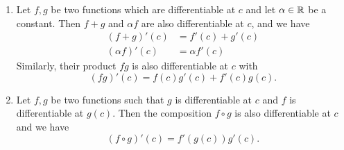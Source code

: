 \documentclass[10pt, a4paper]{article}
\begin{document}
\begin{theorem}\label{pre:analy:thm:sumscalarprodcomprulesfordiff}
    \begin{enumerate}[label = (\alph*)]
        \item 
        Let $f, g$ be two functions which are differentiable at $c$ and let $\alpha \in \mathbb{R}$ be a constant.
        Then $f + g$ and $\alpha f$ are also differentiable at $c$,
        and we have
        \begin{align*}
            (f + g)'(c) &= f'(c) + g'(c) \\
            (\alpha f)'(c) &= \alpha f'(c)
        \end{align*}
        Similarly,
        their product $fg$ is also differentiable at $c$ with
        \[
        (fg)'(c) = f(c)g'(c) + f'(c)g(c).
        \]

        \item
        Let $f, g$ be two functions such that $g$ is differentiable at $c$ and $f$ is differentiable at $g(c)$.
        Then the composition $f \circ g$ is also differentiable at $c$ and we have
        \[
        (f \circ g)'(c) = f'(g(c))g'(c).
        \]
        

\end{enumerate}
\end{theorem}
\end{document}
